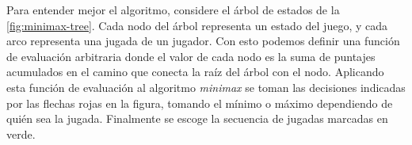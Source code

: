  Para entender mejor el algoritmo, considere el árbol de estados de la 
  \cref{fig:minimax-tree}.
  Cada nodo del árbol representa un estado del juego, y cada arco representa una jugada de un 
  jugador.
  Con esto podemos definir una función de evaluación arbitraria donde el valor de cada nodo
  es la suma de puntajes acumulados en el camino que conecta la raíz del árbol con el nodo.
  Aplicando esta función de evaluación al algoritmo \textit{minimax} se toman las decisiones
  indicadas por las flechas rojas en la figura, tomando el mínimo o máximo dependiendo de quién
  sea la jugada.
  Finalmente se escoge la secuencia de jugadas marcadas en verde.
  
